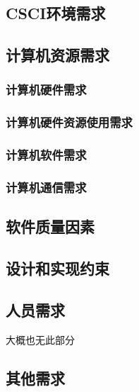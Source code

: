\subsection{CSCI环境需求}

\subsection{计算机资源需求}
\subsubsection{计算机硬件需求}

\subsubsection{计算机硬件资源使用需求}

\subsubsection{计算机软件需求}

\subsubsection{计算机通信需求}

\subsection{软件质量因素}

\subsection{设计和实现约束}

\subsection{人员需求}
大概也无此部分

\subsection{其他需求}



\endinput